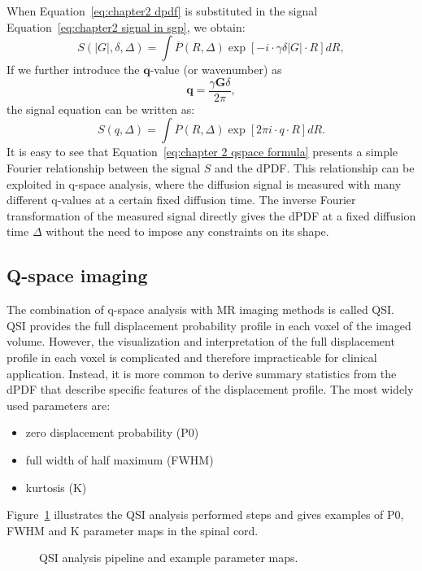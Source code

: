 When Equation~\ref{eq:chapter2 dpdf} is substituted in the signal Equation~\ref{eq:chapter2 signal in sgp}, we obtain:
\begin{equation}
		S(|G|,\delta,\Delta)=\int \overline{P}(R,\Delta) \exp[-i\cdot \gamma \delta |G|\cdot R] dR,
\end{equation}
If we further introduce the $\textbf{q}$-value (or wavenumber) as
 \begin{equation}
\textbf{q}=\frac{\gamma \textbf{G}\delta}{2\pi},
\label{eq: chapter 2 q value definition}
\end{equation}
the signal equation can be written as:
\begin{equation}
		S(q,\Delta)=\int \overline{P}(R,\Delta) \exp[2\pi i \cdot q\cdot R] dR.
\label{eq:chapter 2 qspace formula}
\end{equation}
It is easy to see that Equation~\ref{eq:chapter 2 qspace formula} presents a simple Fourier relationship between the signal $S$ and the \gls{dPDF}. This relationship can be exploited in q-space analysis, where the diffusion signal is measured with many different q-values at a certain fixed diffusion time. The inverse Fourier transformation of the measured signal directly gives the \gls{dPDF} at a fixed diffusion time $\Delta$ without the need to impose any constraints on its shape.

\subsection{Q-space imaging}
\label{sec:qspace}
The combination of q-space analysis with MR imaging methods is called \gls{QSI}\citep{Callaghan:1991,Assaf:2000}. \Gls{QSI} provides the full displacement probability profile in each voxel of the imaged volume. However, the visualization and interpretation of the full displacement profile in each voxel is complicated and therefore impracticable for clinical application. Instead, it is more common to derive summary statistics from the \gls{dPDF} that describe specific features of the displacement profile. The most widely used parameters are: 
\begin{itemize}
\item zero displacement probability (P0)
\item full width of half maximum (FWHM)
\item kurtosis (K)
\end{itemize}
Figure~\ref{fig:chapter 2 QSI analysis} illustrates the QSI analysis performed steps and gives examples of P0, FWHM and K parameter maps in the spinal cord.
\begin{figure}[htbp]
 \centering
 \caption{QSI analysis pipeline and example parameter maps.}
 \label{fig:chapter 2 QSI analysis}
\end{figure}

